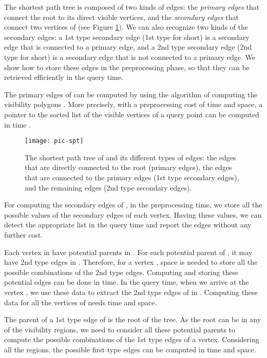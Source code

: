 \documentclass[5p]{elsarticle}
\begin{document}
The shortest path tree  is composed of two
kinds of edges: the {\em primary edges} that connect the root  to its direct visible
vertices, and the {\em secondary edges} that connect two vertices of 
(see Figure \ref{fig:pspt}).
We can also recognize two kinds of the secondary edges: a 1st type secondary edge 
(1st type for short) is a secondary edge that is connected to a primary edge, 
and a 2nd type secondary edge (2nd type for short) is a secondary edge that is not connected 
to a primary edge. We show how to store these edges in the preprocessing phase, so that
they can be retrieved efficiently in the query time.

The primary edges of  can be computed 
by using the algorithm of computing the visibility polygons \cite{bose}. 
More precisely, with a preprocessing cost of  time and  space, 
a pointer to the sorted list of the visible vertices of a query point  can be 
computed in time .


\begin{figure}[h]
  \centering
  \texttt{[image: pic-spt]}   \caption{The shortest path tree of  and its different types of edges:
	the edges that are directly connected to the root  (primary edges),  
	the edges that are connected to the primary edges (1st type secondary edges), 
	and the remaining edges (2nd type secondary edges).}
  \label{fig:pspt}
\end{figure}



For computing the secondary edges of ,
in the preprocessing time,
we store all the possible values of the secondary edges of each vertex. 
Having these values, we can detect the appropriate list in the query time
and report the edges without any further cost.

Each vertex  in  have  potential parents in . For each potential parent
of , it may have  2nd type edges in . Therefore, for a vertex , 
 space is needed to store all the possible combinations of the 2nd type edges. 
Computing and storing these potential edges can be done in  time. 
In the query time, when we arrive at the vertex , we use these 
data to extract the 2nd type edges of  in . Computing these data for all the 
vertices of  needs  time and  space.

The parent of a 1st type edge of  is the root of 
the tree. As the root can be in any of the  visibility regions, 
we need to consider all these potential parents to compute
the possible combinations of the 1st type edges of a vertex.
Considering all the regions, the possible first type edges
can be computed in  time and  space. 
\end{document}
